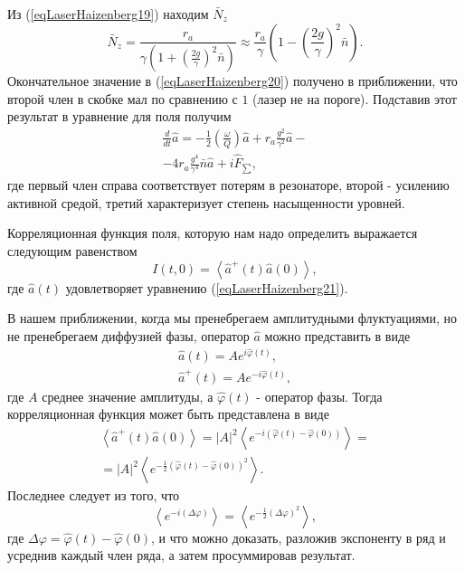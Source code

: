 Из (\ref{eqLaserHaizenberg19}) находим $\bar{N}_z$
\begin{equation}
\bar{N}_z = \frac{r_a}{\gamma\left(1+ \left(\frac{2
    g}{\gamma}\right)^2 \bar{n}\right)} 
\approx
\frac{r_a}{\gamma}
\left(1 - \left(\frac{2 g}{\gamma}\right)^2
\bar{n}\right).
\label{eqLaserHaizenberg20}
\end{equation}
Окончательное значение в (\ref{eqLaserHaizenberg20}) получено в
приближении, что второй член в скобке мал по сравнению с $1$ (лазер не
на пороге). Подставив этот результат в уравнение для поля получим
\begin{eqnarray}
\frac{d}{dt}\hat{a} = -\frac{1}{2}\left(\frac{\omega}{Q}\right)\hat{a}
+ r_a \frac{g^2}{\gamma^2}\hat{a} - 
\nonumber \\
- 4 r_a\frac{g^4}{\gamma^4} \bar{n}\hat{a} + i \hat{F}_{\sum},
\label{eqLaserHaizenberg21}
\end{eqnarray}
где первый член справа соответствует потерям в резонаторе, второй -
усилению активной средой, третий характеризует степень насыщенности
уровней. 

Корреляционная функция поля, которую нам надо определить выражается
следующим равенством
\begin{equation}
I\left(t, 0\right) = \left<\hat{a}^{+}\left(t\right)\hat{a}\left(0\right)\right>,
\nonumber
\end{equation}
где $\hat{a}\left(t\right)$ удовлетворяет уравнению
(\ref{eqLaserHaizenberg21}). 

В нашем приближении, когда мы пренебрегаем амплитудными флуктуациями,
но не пренебрегаем диффузией фазы, оператор $\hat{a}$ можно
представить в виде
\begin{eqnarray}
\hat{a}\left(t\right) = A e^{i\hat{\varphi}\left(t\right)},
\nonumber \\
\hat{a}^{+}\left(t\right) = A e^{-i\hat{\varphi}\left(t\right)},
\label{eqLaserHaizenbergAConstPhi}
\end{eqnarray}
где $A$ среднее значение амплитуды, а $\hat{\varphi}\left(t\right)$ -
оператор фазы. Тогда корреляционная функция может быть представлена в
виде 
\begin{eqnarray}
\left<\hat{a}^{+}\left(t\right)\hat{a}\left(0\right)\right> =
\left|A\right|^2 \left<e^{-i\left(\hat{\varphi}\left(t\right) -
  \hat{\varphi}\left(0\right)\right)}\right> = 
\nonumber \\
= 
\left|A\right|^2 \left<e^{-\frac{1}{2}\left(\hat{\varphi}\left(t\right) -
  \hat{\varphi}\left(0\right)\right)^2}\right>.
\label{eqLaserHaizenbergTaskMiddle}
\end{eqnarray}
Последнее следует из того, что 
\begin{equation}
\left<e^{-i \left(\Delta \varphi\right)}\right> = 
\left<e^{-\frac{1}{2} \left(\Delta \varphi\right)^2}\right>,
\nonumber
\end{equation}
где $\Delta \varphi = \hat{\varphi}\left(t\right) -
\hat{\varphi}\left(0\right)$, и что можно доказать, разложив
экспоненту в ряд и усреднив каждый член ряда, а затем просуммировав
результат.

